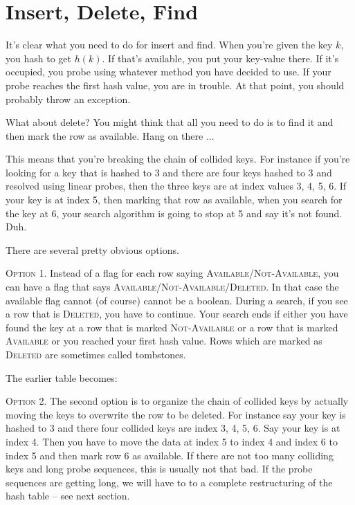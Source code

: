 \newpage
\section{Insert, Delete, Find}

It's clear what you need to do for insert and find.
When you're given the key $k$, you hash to get $h(k)$.
If that's available, you put your key-value there.
If it's occupied, you probe using whatever method you have decided to use.
If your probe reaches the first hash value, you are in trouble.
At that point, you should probably throw an exception.

What about delete?
You might think that all you need to do is to find it
and then mark the row as available.
Hang on there ...

This means that you're breaking the chain of collided keys.
For instance if you're looking for a key that is hashed to
3 and there are four keys hashed to 3 and resolved using linear 
probes, then the three keys are at index values 3, 4, 5, 6.
If your key is at index 5, then marking that row as available,
when you search for the key at 6, your search algorithm is
going to stop at 5 and say it's not found. Duh.

There are several pretty obvious options.

\textsc{Option 1.}
Instead of a flag for each row saying
\textsc{Available}/\textsc{Not-Available},
you can have a flag that says
\textsc{Available}/\textsc{Not-Available}/\textsc{Deleted}.
In that case the available flag cannot (of course) cannot be a boolean.
During a search, if you see a row that is \textsc{Deleted},
you have to continue.
Your search ends if either you have found the key at a row that is
marked \textsc{Not-Available} or a row that is marked
\textsc{Available} or you reached
your first hash value.
Rows which are marked as \textsc{Deleted} are sometimes called tombstones.

The earlier table becomes:


\textsc{Option 2.}
The second option is to organize the chain of collided keys by 
actually moving the keys to overwrite the row to be deleted.
For instance say your key is hashed to 3 and there four 
collided keys are index 3, 4, 5, 6.
Say your key is at index 4.
Then you have to move the data at index 5 to index 4 and index 6 to index 5
and then mark row 6 as available.
If there are not too many colliding keys and long probe sequences,
this is usually not that bad.
If the probe sequences are getting long, we will have to to a 
complete restructuring of the hash table -- see next section.

